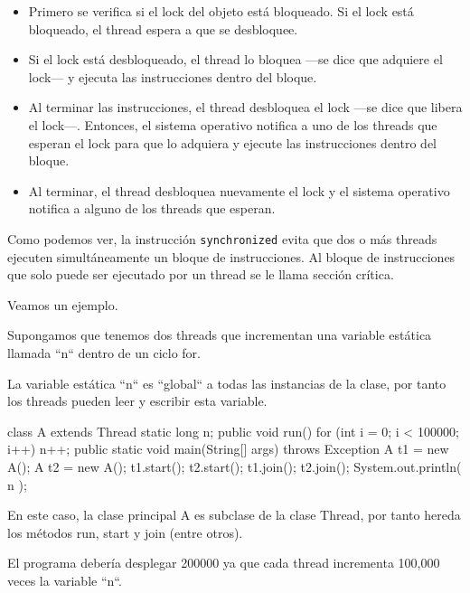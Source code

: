 \begin{itemize}

\item Primero se verifica si el lock del objeto está bloqueado. Si el lock está bloqueado, el thread espera a que se desbloquee.

\item Si el lock está desbloqueado, el thread lo bloquea —se dice que adquiere el lock— y ejecuta las instrucciones dentro del bloque.

\item Al terminar las instrucciones, el thread desbloquea el lock —se dice que libera el lock—. Entonces, el sistema operativo notifica a uno de los threads que esperan el lock para que lo adquiera y ejecute las instrucciones dentro del bloque.

\item Al terminar, el thread desbloquea nuevamente el lock y el sistema operativo notifica a alguno de los threads que esperan.

\end{itemize}

Como podemos ver, la instrucción \texttt{synchronized} evita que dos o más threads ejecuten simultáneamente un bloque de instrucciones. Al bloque de instrucciones que solo puede ser ejecutado por un thread se le llama sección crítica.

Veamos un ejemplo.

Supongamos que tenemos dos threads que incrementan una variable estática llamada ``n`` dentro de un ciclo for.

La variable estática ``n`` es ``global`` a todas las instancias de la clase, por tanto los threads pueden leer y escribir esta variable.

\begin{SourceCode}
class A extends Thread
{
  static long n;
  public void run()
  {
    for (int i = 0; i < 100000; i++)
        n++;
  }
  public static void main(String[] args) throws Exception
  {
    A t1 = new A();
    A t2 = new A();
    t1.start();
    t2.start();
    t1.join();
    t2.join();
    System.out.println( n );
  }
}
\end{SourceCode}

En este caso, la clase principal A es subclase de la clase Thread, por tanto hereda los métodos run, start y join (entre otros).

El programa debería desplegar 200000 ya que cada thread incrementa 100,000 veces la variable ``n``.

